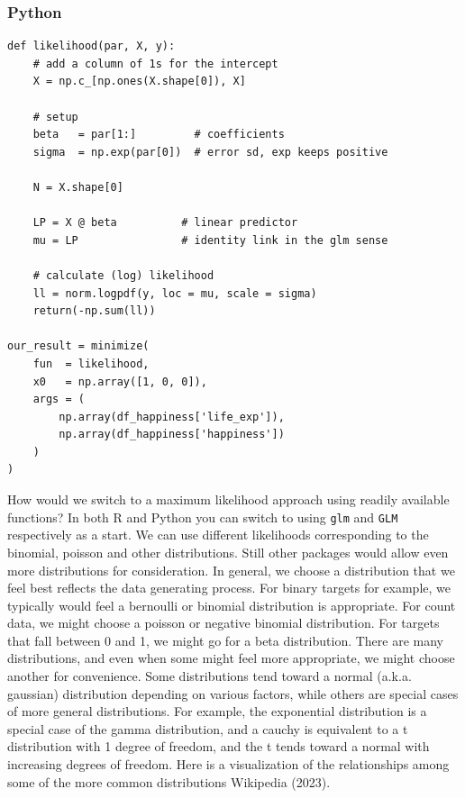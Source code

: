 \documentclass[
  letterpaper,
]{krantz}
\begin{document}
\subsubsection{Python}

\begin{verbatim}
def likelihood(par, X, y):
    # add a column of 1s for the intercept
    X = np.c_[np.ones(X.shape[0]), X]

    # setup
    beta   = par[1:]         # coefficients
    sigma  = np.exp(par[0])  # error sd, exp keeps positive

    N = X.shape[0]

    LP = X @ beta          # linear predictor
    mu = LP                # identity link in the glm sense

    # calculate (log) likelihood
    ll = norm.logpdf(y, loc = mu, scale = sigma) 
    return(-np.sum(ll))

our_result = minimize(
    fun  = likelihood,
    x0   = np.array([1, 0, 0]),
    args = (
        np.array(df_happiness['life_exp']), 
        np.array(df_happiness['happiness'])
    )
)
\end{verbatim}

How would we switch to a maximum likelihood approach using readily
available functions? In both R and Python you can switch to using
\texttt{glm} and \texttt{GLM} respectively as a start. We can use
different likelihoods corresponding to the binomial, poisson and other
distributions. Still other packages would allow even more distributions
for consideration. In general, we choose a distribution that we feel
best reflects the data generating process. For binary targets for
example, we typically would feel a bernoulli or binomial distribution is
appropriate. For count data, we might choose a poisson or negative
binomial distribution. For targets that fall between 0 and 1, we might
go for a beta distribution. There are many distributions, and even when
some might feel more appropriate, we might choose another for
convenience. Some distributions tend toward a normal (a.k.a. gaussian)
distribution depending on various factors, while others are special
cases of more general distributions. For example, the exponential
distribution is a special case of the gamma distribution, and a cauchy
is equivalent to a t distribution with 1 degree of freedom, and the t
tends toward a normal with increasing degrees of freedom. Here is a
visualization of the relationships among some of the more common
distributions Wikipedia (2023).
\end{document}
